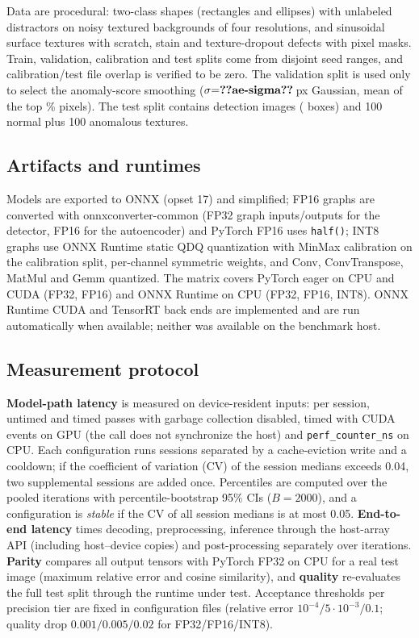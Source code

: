 \documentclass[conference]{IEEEtran}
\begin{document}
Data are procedural: two-class shapes (rectangles and ellipses) with unlabeled distractors on noisy textured
backgrounds of four resolutions, and sinusoidal surface textures with scratch, stain and texture-dropout defects with
pixel masks. Train, validation, calibration and test splits come from disjoint seed ranges, and calibration/test file
overlap is verified to be zero. The validation split is used only to select the anomaly-score smoothing
($\sigma{=}\res{ae-sigma}$\,px Gaussian, mean of the top \% pixels). The test split contains
 detection images ( boxes) and 100 normal plus 100 anomalous textures.

\subsection{Artifacts and runtimes}
Models are exported to ONNX (opset 17) and simplified; FP16 graphs are converted with onnxconverter-common (FP32 graph
inputs/outputs for the detector, FP16 for the autoencoder) and PyTorch FP16 uses \texttt{half()}; INT8 graphs use ONNX
Runtime static QDQ quantization with MinMax calibration on the calibration split, per-channel symmetric weights, and
Conv, ConvTranspose, MatMul and Gemm quantized. The matrix covers PyTorch eager on CPU and CUDA (FP32, FP16) and ONNX
Runtime on CPU (FP32, FP16, INT8). ONNX Runtime CUDA and TensorRT back ends are implemented and are run automatically
when available; neither was available on the benchmark host.

\subsection{Measurement protocol}
\textbf{Model-path latency} is measured on device-resident inputs: per session,  untimed
and  timed passes with garbage collection disabled, timed with CUDA events on GPU (the
call does not synchronize the host) and \texttt{perf\_counter\_ns} on CPU. Each configuration runs
 sessions separated by a cache-eviction write and a cooldown; if the coefficient of
variation (CV) of the session medians exceeds 0.04, two supplemental sessions are added once. Percentiles are computed
over the pooled iterations with percentile-bootstrap 95\% CIs ($B{=}2000$), and a configuration is \emph{stable} if
the CV of all session medians is at most 0.05.
\textbf{End-to-end latency} times decoding, preprocessing, inference through the host-array API (including
host--device copies) and post-processing separately over  iterations.
\textbf{Parity} compares all output tensors with PyTorch FP32 on CPU for a real test image (maximum relative error
and cosine similarity), and \textbf{quality} re-evaluates the full test split through the runtime under test.
Acceptance thresholds per precision tier are fixed in configuration files (relative error $10^{-4}/5{\cdot}10^{-3}/0.1$;
quality drop $0.001/0.005/0.02$ for FP32/FP16/INT8).
\end{document}
